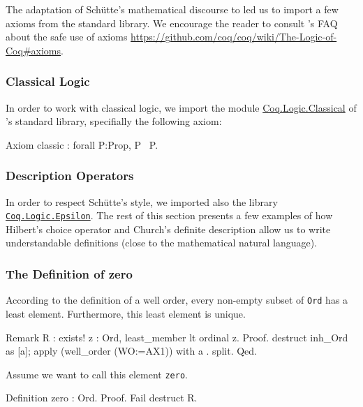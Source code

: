 The adaptation of Schütte's mathematical discourse to \coq{} led us to
import a few axioms from the standard library. We encourage the reader to consult \coq{}'s FAQ about the safe use of axioms
 \url{https://github.com/coq/coq/wiki/The-Logic-of-Coq#axioms}.

\subsubsection{Classical Logic}

In order to work with classical logic, we import the module
\href{https://coq.inria.fr/distrib/current/stdlib/Coq.Logic.Classical.html}{Coq.Logic.Classical}  of \coq{}'s standard library, specifially the following axiom:

\begin{Coqsrc}
 Axiom classic : forall P:Prop, P \/ ~P.
\end{Coqsrc}


\subsubsection{Description Operators}

In order to respect Schütte's style, we imported also the library 
\href{https://coq.inria.fr/distrib/current/stdlib/Coq.Logic.Epsilon.html}{\texttt{Coq.Logic.Epsilon}}.  The rest of this section presents a few examples of
how Hilbert's choice operator and Church's definite description allow us
 to write understandable definitions (close to the mathematical natural language).


\subsubsection{The Definition of zero}

According to the  definition of a well order, every non-empty subset of \texttt{Ord} has a least element. Furthermore, this least element is unique.


\begin{Coqsrc}
Remark R : exists! z : Ord, least_member lt  ordinal z.
Proof.
  destruct inh_Ord as [a]; apply (well_order (WO:=AX1)) with a .
  split.
Qed.
\end{Coqsrc}

Assume we want to call this element  \texttt{zero}.



\begin{Coqsrc}
Definition zero : Ord.
Proof.
  Fail destruct R.
\end{Coqsrc}

